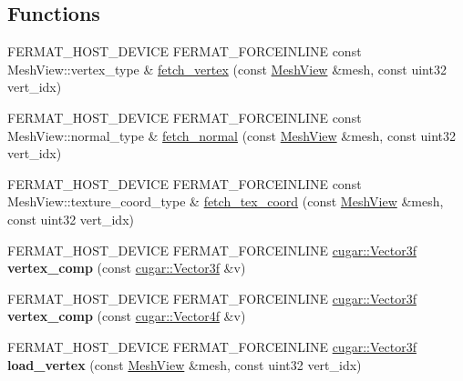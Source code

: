 \subsection*{Functions}
\begin{DoxyCompactItemize}
\item 
F\+E\+R\+M\+A\+T\+\_\+\+H\+O\+S\+T\+\_\+\+D\+E\+V\+I\+CE F\+E\+R\+M\+A\+T\+\_\+\+F\+O\+R\+C\+E\+I\+N\+L\+I\+NE const Mesh\+View\+::vertex\+\_\+type \& \hyperlink{group___mesh_module_ga4b65791b4c323a93e391c4c2e88cd601}{fetch\+\_\+vertex} (const \hyperlink{struct_mesh_view}{Mesh\+View} \&mesh, const uint32 vert\+\_\+idx)
\item 
F\+E\+R\+M\+A\+T\+\_\+\+H\+O\+S\+T\+\_\+\+D\+E\+V\+I\+CE F\+E\+R\+M\+A\+T\+\_\+\+F\+O\+R\+C\+E\+I\+N\+L\+I\+NE const Mesh\+View\+::normal\+\_\+type \& \hyperlink{group___mesh_module_ga2d3d06537c1b2fc31399190bd353f6e6}{fetch\+\_\+normal} (const \hyperlink{struct_mesh_view}{Mesh\+View} \&mesh, const uint32 vert\+\_\+idx)
\item 
F\+E\+R\+M\+A\+T\+\_\+\+H\+O\+S\+T\+\_\+\+D\+E\+V\+I\+CE F\+E\+R\+M\+A\+T\+\_\+\+F\+O\+R\+C\+E\+I\+N\+L\+I\+NE const Mesh\+View\+::texture\+\_\+coord\+\_\+type \& \hyperlink{group___mesh_module_gae33ea9281c4276a5132e37c0b1331069}{fetch\+\_\+tex\+\_\+coord} (const \hyperlink{struct_mesh_view}{Mesh\+View} \&mesh, const uint32 vert\+\_\+idx)
\item 
\mbox{\label{group___mesh_module_ga88236b1818256e4d96ccf5178b6d9fda}} 
F\+E\+R\+M\+A\+T\+\_\+\+H\+O\+S\+T\+\_\+\+D\+E\+V\+I\+CE F\+E\+R\+M\+A\+T\+\_\+\+F\+O\+R\+C\+E\+I\+N\+L\+I\+NE \hyperlink{structcugar_1_1_vector}{cugar\+::\+Vector3f} {\bfseries vertex\+\_\+comp} (const \hyperlink{structcugar_1_1_vector}{cugar\+::\+Vector3f} \&v)
\item 
\mbox{\label{group___mesh_module_ga430921440b8a3c52fabcc20083f19bb4}} 
F\+E\+R\+M\+A\+T\+\_\+\+H\+O\+S\+T\+\_\+\+D\+E\+V\+I\+CE F\+E\+R\+M\+A\+T\+\_\+\+F\+O\+R\+C\+E\+I\+N\+L\+I\+NE \hyperlink{structcugar_1_1_vector}{cugar\+::\+Vector3f} {\bfseries vertex\+\_\+comp} (const \hyperlink{structcugar_1_1_vector}{cugar\+::\+Vector4f} \&v)
\item 
\mbox{\label{group___mesh_module_ga7da0b06ec3de5cd39e896513c6e443e3}} 
F\+E\+R\+M\+A\+T\+\_\+\+H\+O\+S\+T\+\_\+\+D\+E\+V\+I\+CE F\+E\+R\+M\+A\+T\+\_\+\+F\+O\+R\+C\+E\+I\+N\+L\+I\+NE \hyperlink{structcugar_1_1_vector}{cugar\+::\+Vector3f} {\bfseries load\+\_\+vertex} (const \hyperlink{struct_mesh_view}{Mesh\+View} \&mesh, const uint32 vert\+\_\+idx)

\end{DoxyCompactItemize}
